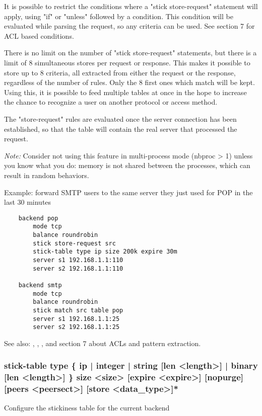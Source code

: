   It is possible to restrict the conditions where a "stick store-request"
  statement will apply, using "if" or "unless" followed by a condition. This
  condition will be evaluated while parsing the request, so any criteria can be
  used. See section 7 for ACL based conditions.

  There is no limit on the number of "stick store-request" statements, but
  there is a limit of 8 simultaneous stores per request or response. This
  makes it possible to store up to 8 criteria, all extracted from either the
  request or the response, regardless of the number of rules. Only the 8 first
  ones which match will be kept. Using this, it is possible to feed multiple
  tables at once in the hope to increase the chance to recognize a user on
  another protocol or access method.

  The "store-request" rules are evaluated once the server connection has been
  established, so that the table will contain the real server that processed
  the request.

  \emph{Note:} Consider not using this feature in multi-process mode (nbproc > 1)
         unless you know what you do: memory is not shared between the
         processes, which can result in random behaviors.

  Example: forward SMTP users to the same server they just used for POP in the last 30 minutes
  \begin{verbatim}
    backend pop
        mode tcp
        balance roundrobin
        stick store-request src
        stick-table type ip size 200k expire 30m
        server s1 192.168.1.1:110
        server s2 192.168.1.1:110

    backend smtp
        mode tcp
        balance roundrobin
        stick match src table pop
        server s1 192.168.1.1:25
        server s2 192.168.1.1:25
   \end{verbatim}

  See also: , , ,  and section 7
             about ACLs and pattern extraction.

\subsubsection[stick-table type]{stick-table type \{ ip | integer | string [len <length>] | binary [len <length>] \} size <size> [expire <expire>] [nopurge] [peers <peersect>] [store <data\_type>]*}

  Configure the stickiness table for the current backend

